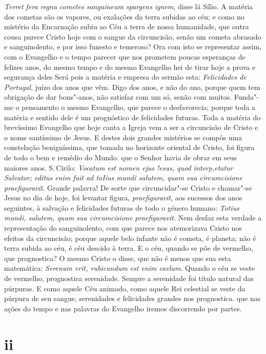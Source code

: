 \emph{Terret fera regna cometes sanguineum spargens ignem}, disse lá
Sílio. A matéria dos cometas são os vapores, ou exalações da terra
subidas ao céu; e como no mistério da Encarnação subiu ao Céu a terra de
nossa humanidade, que outra cousa parece Cristo hoje com o sangue da
circuncisão, senão um cometa abrasado e sanguinolento, e por isso
funesto e temeroso? Ora com isto se representar assim, com o Evangelho e
o tempo parecer que nos prometem poucas esperanças de felizes anos, do
mesmo tempo e do mesmo Evangelho hei de tirar hoje a prova e segurança
deles Será pois a matéria e empresa do sermão esta: \emph{Felicidades
de Portugal}, juízo dos anos que vêm. Digo dos anos, e não do ano,
porque quem tem obrigação de dar bons"-anos, não satisfaz com um só,
senão com muitos. Funda"-me o pensamento o mesmo Evangelho, que parece o
desfavorecia; porque toda a matéria e sentido dele é um prognóstico de
felicidades futuras.
Toda a matéria do brevíssimo Evangelho que hoje canta a Igreja vem a ser
a circuncisão de Cristo e o nome santíssimo de Jesus. E destes dois
grandes mistérios se compôs uma constelação benigníssima, que tomada no
horizonte oriental de Cristo, foi figura de todo o bem e remédio do
Mundo. que o Senhor havia de obrar em seus maiores anos. S.\,Cirilo:
\emph{Vocatum est nomen ejus !esus, quod interp,etatur Salvator; editus
enim fuit ad toIius mundi salutem, quam sua circumcisione
praefiguravit}. Grande palavra! De sorte que circuncidar"-se Cristo e
chamar"-se Jesus no dia de hoje, foi levantar figura,
\emph{praefiguravit}, aos sucessos dos anos seguintes, à salvação e
felicidades futuras de todo o género humano: \emph{Totius mundi,
salutem, quum sua circumcisione praefiguravit}. Nem desfaz esta verdade
a representação do sanguinolento, com que parece nos atemorizava Cristo
nos efeitos da circuncisão; porque aquele belo infante não é cometa, é
planeta; não é terra subida ao céu, é céu descido à terra. E o céu,
quando se põe de vermelho, que prognostica? O mesmo Cristo o disse,
que não é menos que sua esta matemática: \emph{Serenum erit, rubicundum
est enim caelum}. Quando o céu se veste de vermelho, prognostica
serenidade. Sempre a serenidade foi título natural das púrpuras. E como
aquele Céu animado, como aquele Rei celestial se veste da púrpura de seu
sangue, serenidades e felicidades grandes nos prognostica. que nas ações
do tempo e nas palavras do Evangelho iremos discorrendo por partes.

\section{ii}

